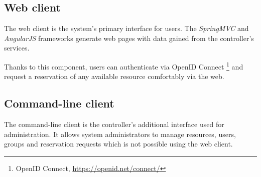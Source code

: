 \subsection{Web client} \label{webclient}
The web client is the system's primary interface for users. The \emph{SpringMVC} and \emph{AngularJS} frameworks generate web pages with data gained from the controller’s services.

Thanks to this component, users can authenticate via OpenID Connect \footnote{OpenID Connect, \url{https://openid.net/connect/}} and request a reservation of any available resource comfortably via the web.

\subsection{Command-line client}
The command-line client is the controller's additional interface used for administration. It allows system administrators to manage resources, users, groups and reservation requests which is not possible using the web client.

